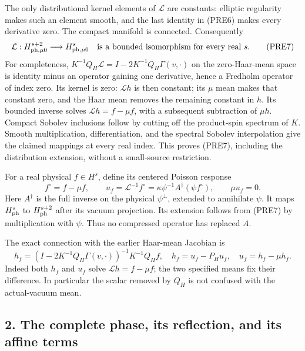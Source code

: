 \documentclass[11pt]{article}
\begin{document}
The only distributional kernel elements of \(\mathcal L\) are constants: elliptic regularity makes such an element smooth, and the last identity in (PRE6) makes every derivative zero. The compact manifold is connected. Consequently
\[
 \mathcal L:H^{s+2}_{{\rm ph},\mu0}\longrightarrow
 H^s_{{\rm ph},\mu0}
 \quad\hbox{is a bounded isomorphism for every real }s.
 \tag{PRE7}
\]
For completeness, \(K^{-1}Q_H\mathcal L=I-2K^{-1}Q_H\Gamma(v,\cdot)\) on the zero-Haar-mean space is identity minus an operator gaining one derivative, hence a Fredholm operator of index zero. Its kernel is zero: \(\mathcal Lh\) is then constant; its \(\mu\) mean makes that constant zero, and the Haar mean removes the remaining constant in \(h\). Its bounded inverse solves \(\mathcal Lh=f-\mu f\), with a subsequent subtraction of \(\mu h\). Compact Sobolev inclusions follow by cutting off the product-spin spectrum of \(K\). Smooth multiplication, differentiation, and the spectral Sobolev interpolation give the claimed mappings at every real index. This proves (PRE7), including the distribution extension, without a small-source restriction.

For a real physical \(f\in H^s\), define its centered Poisson response
\[
 f^\circ=f-\mu f,\qquad
 u_f=\mathcal L^{-1}f^\circ
       =\kappa\psi^{-1}A^\dagger(\psi f^\circ),\qquad \mu u_f=0.
 \tag{PRE8}
\]
Here \(A^\dagger\) is the full inverse on the physical \(\psi^\perp\), extended to annihilate \(\psi\). It maps \(H^s_{\rm ph}\) to \(H^{s+2}_{\rm ph}\) after its vacuum projection. Its extension follows from (PRE7) by multiplication with \(\psi\). Thus no compressed operator has replaced \(A\).

The exact connection with the earlier Haar-mean Jacobian is
\[
 h_f=(I-2K^{-1}Q_H\Gamma(v,\cdot))^{-1}K^{-1}Q_Hf,\quad
 h_f=u_f-P_Hu_f,\quad
 u_f=h_f-\mu h_f.
 \tag{PRE9}
\]
Indeed both \(h_f\) and \(u_f\) solve \(\mathcal Lh=f-\mu f\); the two specified means fix their difference. In particular the scalar removed by \(Q_H\) is not confused with the actual-vacuum mean.

\subsection*{2. The complete phase, its reflection, and its affine terms}
\end{document}
